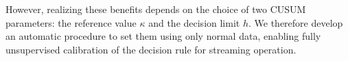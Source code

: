 However, realizing these benefits depends on the choice of two CUSUM parameters: the reference value $\kappa$ and the decision limit $h$. We therefore develop an automatic procedure to set them using only normal data, enabling fully unsupervised calibration of the decision rule for streaming operation.
